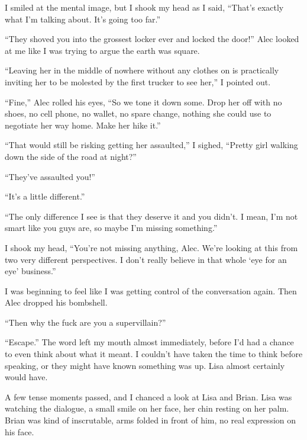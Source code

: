I smiled at the mental image, but I shook my head as I said, ``That's exactly what I'm talking about.  It's going too far.''



``They shoved you into the grossest locker ever and locked the door!'' Alec looked at me like I was trying to argue the earth was square.



``Leaving her in the middle of nowhere without any clothes on is practically inviting her to be molested by the first trucker to see her,'' I pointed out.



``Fine,'' Alec rolled his eyes, ``So we tone it down some.  Drop her off with no shoes, no cell phone, no wallet, no spare change, nothing she could use to negotiate her way home.  Make her hike it.''



``That would still be risking getting her assaulted,'' I sighed, ``Pretty girl walking down the side of the road at night?''



``They've assaulted you!''



``It's a little different.''



``The only difference I see is that they deserve it and you didn't.  I mean, I'm not smart like you guys are, so maybe I'm missing something.''



I shook my head, ``You're not missing anything, Alec.  We're looking at this from two very different perspectives.  I don't really believe in that whole `eye for an eye' business.''



I was beginning to feel like I was getting control of the conversation again.  Then Alec dropped his bombshell.



``Then why the fuck are you a supervillain?''



``Escape.''  The word left my mouth almost immediately, before I'd had a chance to even think about what it meant.  I couldn't have taken the time to think before speaking, or they might have known something was up.  Lisa almost certainly would have.



A few tense moments passed, and I chanced a look at Lisa and Brian.  Lisa was watching the dialogue, a small smile on her face, her chin resting on her palm.  Brian was kind of inscrutable, arms folded in front of him, no real expression on his face.



